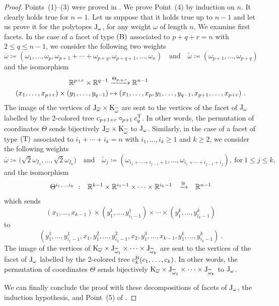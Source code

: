 \documentclass[10pt]{amsart}
\theoremstyle{remark}
\begin{document}
\begin{proof}

Points~(1)--(3) were proved in \cite{Forcey08}.  
We prove Point~(4) by induction on $n$. 
It clearly holds true for $n=1$. Let us suppose that it holds true up to $n-1$ and let us prove it for the polytopes $\mathrm{J}_\omega$, for any weight $\omega$ of length $n$.
We examine first facets. 
In the case of a facet of type $(\mathrm{B})$ associated to $p+q+r=n$ with $2\leq q \leq n-1$, we consider the following two weights 
\[
\overline{\omega}\coloneqq (\omega_1, \ldots, \omega_{p}, \omega_{p+1}+\cdots+\omega_{p+q}, \omega_{p+q+1}, \ldots,  \omega_{n})
\quad \text{and} \quad 
\widetilde{\omega}\coloneqq (\omega_{p+1}, \ldots, \omega_{p+q})
\]
and the isomorphism 
\begin{align*}
\RR^{p+r} \times \RR^{q-1} &\xrightarrow{\Theta_{p,q,r}} \RR^{n-1} \\
(x_1, \ldots, x_{p+r}) \times (y_1, \ldots, y_{q-1}) &\mapsto
(x_1, \ldots, x_{p} , y_1, \ldots, y_{q-1}, x_{p+1}, \ldots, x_{p+r}) \ .
\end{align*}
The image of the vertices of $\mathrm{J}_{\overline{\omega}}\times \mathrm{K}_{\widetilde{\omega}}$ are sent to the vertices of the facet of $\mathrm{J}_\omega$
labelled by the 2-colored tree $c_{p+1+r}\circ_{p+1} c^{\mathrm{T}}_q$. 
In other words, the permutation of coordinates $\Theta$ sends bijectively $\mathrm{J}_{\overline{\omega}}\times \mathrm{K}_{\widetilde{\omega}}$ to $\mathrm{J}_\omega$. 
Similarly, in the case of a facet of type $(\mathrm{T})$ associated to $i_1+\cdots+i_k=n$ with 
$i_1, \ldots,i_k\geq 1$ and $k\geq 2$, 
 we consider the following weights 
%
\[
\overline{\omega}\coloneqq \big(\sqrt{2}\omega_{I_1}, \ldots, \sqrt{2}\omega_{I_k}\big)
\quad \text{and} \quad 
\widetilde{\omega}_j\coloneqq (\omega_{i_1+\cdots+i_{j-1}+1}, \ldots, \omega_{i_1+\cdots+i_{j-1}+i_j}), \ \text{for}\ 1\leq j\leq k, 
\]
and the isomorphism 
\begin{align*}
\begin{array}{rccc}
\Theta^{i_1, \ldots, i_k}\  : &  \mathbb{R}^{k-1}\times \mathbb{R}^{i_1-1}\times \cdots \times \mathbb{R}^{i_k-1} &\xrightarrow{\cong} &\mathbb{R}^{n-1}
\end{array}
\end{align*}
which sends 
\[(x_1, \ldots, x_{k-1})\times (y_1^1, \ldots, y^1_{i_1-1})\times \cdots 
\times (y_1^k, \ldots, y^k_{i_k-1})\]
to 
\[(
y^1_1,\ldots, y^1_{i_1-1}, x_1, y^2_1, \ldots, y^2_{i_2-1}, x_2, y^3_1, \ldots, x_{k-1}, y^k_1, \ldots, y^k_{i_k-1}
)\ .\]
The image of the vertices of 
$\mathrm{K}_{\overline{\omega}}\times \mathrm{J}_{\widetilde{\omega}_1}\times \cdots \times \mathrm{J}_{\widetilde{\omega}_k}$ are sent to the vertices of the facet of $\mathrm{J}_\omega$
labelled by the 2-colored tree $c^{\mathrm{B}}_k(c_1, \ldots, c_k)$. In other words, the permutation of coordinates $\Theta$ sends bijectively $\mathrm{K}_{\overline{\omega}}\times \mathrm{J}_{\widetilde{\omega}_1}\times \cdots \times \mathrm{J}_{\widetilde{\omega}_k}$ to $\mathrm{J}_\omega$. 

We can finally conclude the proof with these decompositions of facets of $\mathrm{J}_\omega$, the induction hypothesis, and Point~(5) of \cite[Proposition~1]{MTTV19}.
\end{proof}
\end{document}

